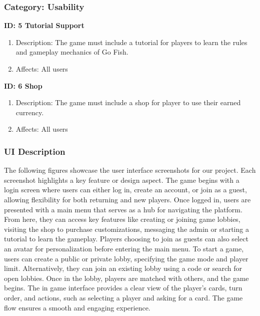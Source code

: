 \subsubsection{Category: Usability}

\textbf{ID: 5 Tutorial Support}
\begin{enumerate}
    \item Description: The game must include a tutorial for players to learn the rules and gameplay mechanics of Go Fish.
    \item Affects: All users
\end{enumerate}

\textbf{ID: 6 Shop}
\begin{enumerate}
    \item Description: The game must include a shop for player to use their earned currency.
    \item Affects: All users
\end{enumerate}

\subsubsection{UI Description}

The following figures showcase the user interface screenshots for our project. Each screenshot highlights a key feature or design aspect. The game begins with a login screen where users can either log in, create an account, or join as a guest, allowing flexibility for both returning and new players. Once logged in, users are presented with a main menu that serves as a hub for navigating the platform. From here, they can access key features like creating or joining game lobbies, visiting the shop to purchase customizations, messaging the admin or starting a tutorial to learn the gameplay. Players choosing to join as guests can also select an avatar for personalization before entering the main menu. To start a game, users can create a public or private lobby, specifying the game mode and player limit. Alternatively, they can join an existing lobby using a code or search for open lobbies. Once in the lobby, players are matched with others, and the game begins. The in game interface provides a clear view of the player's cards, turn order, and actions, such as selecting a player and asking for a card. The game flow ensures a smooth and engaging experience.

